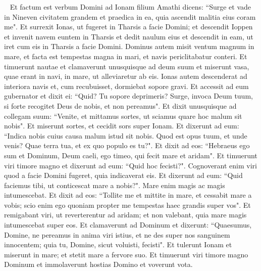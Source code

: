 
\begin{biblechapter}   
\verse Et factum est verbum Domini ad Ionam filium Amathi dicens: 
\verse “Surge et vade in Nineven civitatem grandem et praedica in ea, quia ascendit malitia eius coram me". 
\verse Et surrexit Ionas, ut fugeret in Tharsis a facie Domini; et descendit Ioppen et invenit navem euntem in Tharsis et dedit naulum eius et descendit in eam, ut iret cum eis in Tharsis a facie Domini. 
\verse Dominus autem misit ventum magnum in mare, et facta est tempestas magna in mari, et navis periclitabatur conteri. 
\verse Et timuerunt nautae et clamaverunt unusquisque ad deum suum et miserunt vasa, quae erant in navi, in mare, ut alleviaretur ab eis. Ionas autem descenderat ad interiora navis et, cum recubuisset, dormiebat sopore gravi. 
\verse Et accessit ad eum gubernator et dixit ei: “Quid? Tu sopore deprimeris? Surge, invoca Deum tuum, si forte recogitet Deus de nobis, et non pereamus". 
\verse Et dixit unusquisque ad collegam suum: “Venite, et mittamus sortes, ut sciamus quare hoc malum sit nobis". Et miserunt sortes, et cecidit sors super Ionam. 
\verse Et dixerunt ad eum: “Indica nobis cuius causa malum istud sit nobis. Quod est opus tuum, et unde venis? Quae terra tua, et ex quo populo es tu?". 
\verse Et dixit ad eos: “Hebraeus ego sum et Dominum, Deum caeli, ego timeo, qui fecit mare et aridam". 
\verse Et timuerunt viri timore magno et dixerunt ad eum: “Quid hoc fecisti?". Cognoverant enim viri quod a facie Domini fugeret, quia indicaverat eis. 
\verse Et dixerunt ad eum: “Quid faciemus tibi, ut conticescat mare a nobis?". Mare enim magis ac magis intumescebat. 
\verse Et dixit ad eos: “Tollite me et mittite in mare, et cessabit mare a vobis; scio enim ego quoniam propter me tempestas haec grandis super vos". 
\verse Et remigabant viri, ut reverterentur ad aridam; et non valebant, quia mare magis intumescebat super eos. 
\verse Et clamaverunt ad Dominum et dixerunt: “Quaesumus, Domine, ne pereamus in anima viri istius, et ne des super nos sanguinem innocentem; quia tu, Domine, sicut voluisti, fecisti". 
\verse Et tulerunt Ionam et miserunt in mare; et stetit mare a fervore suo. 
\verse Et timuerunt viri timore magno Dominum et immolaverunt hostias Domino et voverunt vota. 
\end{biblechapter}

